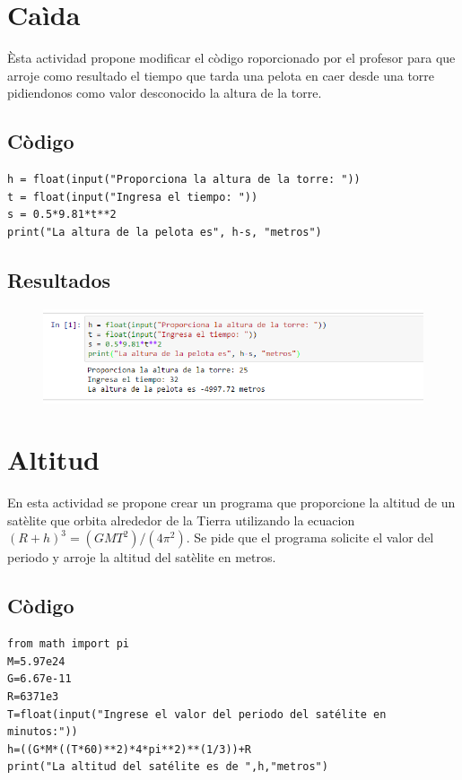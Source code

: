 \documentclass[12pt]{article}
\begin{document}
\section{Caìda}
Èsta actividad propone modificar el còdigo roporcionado por el profesor para que arroje como resultado el tiempo que tarda una pelota en caer desde una torre pidiendonos como valor desconocido la altura de la torre.
\subsection{Còdigo}

\begin{verbatim}
h = float(input("Proporciona la altura de la torre: "))
t = float(input("Ingresa el tiempo: "))
s = 0.5*9.81*t**2
print("La altura de la pelota es", h-s, "metros")
\end{verbatim}
\subsection{Resultados}

\begin{figure}[H]
\centering
\includegraphics[scale=.8]{ca_da}
\end{figure}
\pagebreak

\section{Altitud}
En esta actividad se propone crear un programa que proporcione la altitud de un satèlite que orbita alrededor de la Tierra utilizando la ecuacion $(R+h)^3=(GMT^2)/(4\pi ^2)$. Se pide que el programa solicite el valor del periodo y arroje la altitud del satèlite en metros.
\subsection{Còdigo}

\begin{verbatim}
from math import pi
M=5.97e24
G=6.67e-11
R=6371e3
T=float(input("Ingrese el valor del periodo del satélite en minutos:"))
h=((G*M*((T*60)**2)*4*pi**2)**(1/3))+R
print("La altitud del satélite es de ",h,"metros")
\end{verbatim}
\end{document}
